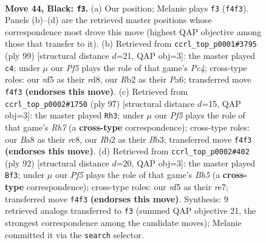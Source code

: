 \documentclass[11pt]{article}
\begin{document}
\clearpage

\begin{figure}[p]\centering
\begin{subfigure}{0.46\textwidth}\centering
\resizebox{\linewidth}{!}{%
\newchessgame
\chessboard[
  setfen={b4k2/P4p2/7K/4PN1P/5p2/R7/1r6/8 b - - 0 44},
  showmover=false,
  pgfstyle=straightmove, color=movearrow, markmove={f4-f3}
]}
\caption{}
\end{subfigure}\hfill
\begin{subfigure}{0.46\textwidth}\centering
\resizebox{\linewidth}{!}{%
\newchessgame
\chessboard[
  setfen={3R3K/7P/pp2k3/2p5/P7/8/8/6r1 b - - 0 50},
  showmover=false,
  pgfstyle=straightmove, color=movearrow, markmove={c5-c4}
]}
\caption{}
\end{subfigure}
\\[4pt]
\begin{subfigure}{0.46\textwidth}\centering
\resizebox{\linewidth}{!}{%
\newchessgame
\chessboard[
  setfen={2R5/8/5pk1/8/4KP2/Pb4N1/7r/8 b - - 2 49},
  showmover=false,
  pgfstyle=straightmove, color=movearrow, markmove={h2-h3}
]}
\caption{}
\end{subfigure}\hfill
\begin{subfigure}{0.46\textwidth}\centering
\resizebox{\linewidth}{!}{%
\newchessgame
\chessboard[
  setfen={R7/4r1k1/7p/5K1B/7p/7P/6P1/2b5 w - - 19 47},
  showmover=false,
  pgfstyle=straightmove, color=movearrow, markmove={h5-f3}
]}
\caption{}
\end{subfigure}
\caption{\textbf{Move 44, Black: \texttt{f3}.} (a) Our position; Melanie plays \texttt{f3} (\texttt{f4f3}). Panels (b)--(d) are the retrieved master positions whose correspondence most drove this move (highest QAP objective among those that transfer to it). (b) Retrieved from \texttt{ccrl\_top\_p0001\#3795} (ply 99) [structural distance $d$=21, QAP obj=3]: the master played \texttt{c4}; under $\mu$ our \emph{Pf5} plays the role of that game's \emph{Pc4}; cross-type roles: our \emph{n}f5 as their \emph{r}d8, our \emph{R}b2 as their \emph{P}a6; transferred move \texttt{f4f3} \textbf{(endorses this move)}. (c) Retrieved from \texttt{ccrl\_top\_p0002\#1750} (ply 97) [structural distance $d$=15, QAP obj=3]: the master played \texttt{Rh3}; under $\mu$ our \emph{Pf5} plays the role of that game's \emph{Rh7} (a \textbf{cross-type} correspondence); cross-type roles: our \emph{B}a8 as their \emph{r}c8, our \emph{R}b2 as their \emph{B}b3; transferred move \texttt{f4f3} \textbf{(endorses this move)}. (d) Retrieved from \texttt{ccrl\_top\_p0002\#402} (ply 92) [structural distance $d$=20, QAP obj=3]: the master played \texttt{Bf3}; under $\mu$ our \emph{Pf5} plays the role of that game's \emph{Bh5} (a \textbf{cross-type} correspondence); cross-type roles: our \emph{n}f5 as their \emph{r}e7; transferred move \texttt{f4f3} \textbf{(endorses this move)}. Synthesis: 9 retrieved analogs transferred to \texttt{f3} (summed QAP objective 21, the strongest correspondence among the candidate moves); Melanie committed it via the \texttt{search} selector.}
\label{fig:thought-m87}
\end{figure}
\end{document}
